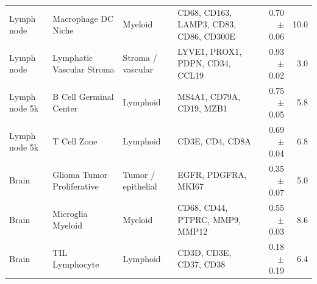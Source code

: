 \begin{tabular}{lll>{\raggedright\arraybackslash}p{5.2cm}rr}
Lymph node & Macrophage DC Niche & Myeloid & CD68, CD163, LAMP3, CD83, CD86, CD300E & 0.70 $\pm$ 0.06 & 10.0 \\
Lymph node & Lymphatic Vascular Stroma & Stroma / vascular & LYVE1, PROX1, PDPN, CD34, CCL19 & 0.93 $\pm$ 0.02 & 3.0 \\
Lymph node 5k & B Cell Germinal Center & Lymphoid & MS4A1, CD79A, CD19, MZB1 & 0.75 $\pm$ 0.05 & 5.8 \\
Lymph node 5k & T Cell Zone & Lymphoid & CD3E, CD4, CD8A & 0.69 $\pm$ 0.04 & 6.8 \\
Brain & Glioma Tumor Proliferative & Tumor / epithelial & EGFR, PDGFRA, MKI67 & 0.35 $\pm$ 0.07 & 5.0 \\
Brain & Microglia Myeloid & Myeloid & CD68, CD44, PTPRC, MMP9, MMP12 & 0.55 $\pm$ 0.03 & 8.6 \\
Brain & TIL Lymphocyte & Lymphoid & CD3D, CD3E, CD37, CD38 & 0.18 $\pm$ 0.19 & 6.4 \\
\bottomrule
\end{tabular}
